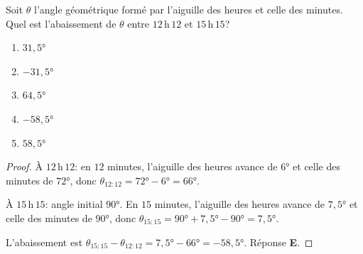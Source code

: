 % 
%
Soit $\theta$ l'angle géométrique formé par l'aiguille des heures et celle des
minutes. Quel est l'abaissement de $\theta$ entre $12$\,h\,$12$ et
$15$\,h\,$15$?
\begin{enumerate}
  \item $31,5°$
  \item $-31,5°$
  \item $64,5°$
  \item $-58,5°$
  \item $58,5°$
\end{enumerate}
%
%
\begin{proof}
À $12$\,h\,$12$: en $12$ minutes, l'aiguille des heures avance de $6°$ et
celle des minutes de $72°$, donc $\theta_{12:12} = 72° - 6° = 66°$.

À $15$\,h\,$15$: angle initial $90°$. En $15$ minutes, l'aiguille des heures
avance de $7,5°$ et celle des minutes de $90°$, donc
$\theta_{15:15} = 90° + 7,5° - 90° = 7,5°$.

L'abaissement est $\theta_{15:15} - \theta_{12:12} = 7,5° - 66° = -58,5°$. Réponse \textbf{E}.
\end{proof}